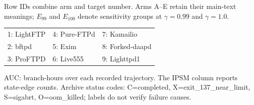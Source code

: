 \begingroup
\small
\setlength{\tabcolsep}{1.6pt}
\renewcommand{\arraystretch}{1.0}
\noindent Row IDs combine arm and target number. Arms A--E retain their main-text meanings; $E_{99}$ and $E_{100}$ denote sensitivity groups at $\gamma=0.99$ and $\gamma=1.0$.
\par\smallskip
\noindent\begin{tabularx}{\columnwidth}{@{}YYY@{}}
1: LightFTP & 4: Pure-FTPd & 7: Kamailio \\
2: bftpd & 5: Exim & 8: Forked-daapd \\
3: ProFTPD & 6: Live555 & 9: Lighttpd1 \\
\end{tabularx}
\par\smallskip
\noindent AUC: branch-hours over each recorded trajectory. The IPSM column reports state-edge counts. Archive status codes: C=completed, X=exit\_137\_near\_limit, S=sigabrt, O=oom\_killed; labels do not verify failure causes.
\par\smallskip
{}
\label{tab:archive_arms}
\tabletail{\bottomrule}
\tablelasttail{\bottomrule}

